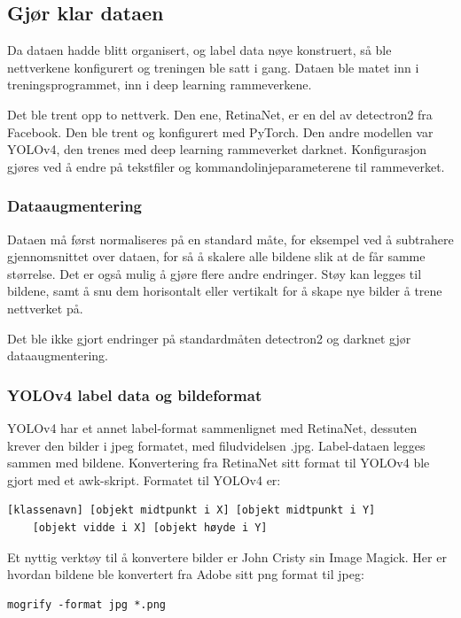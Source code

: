 \subsection{Gjør klar dataen}

Da dataen hadde blitt organisert, og label data nøye konstruert, så ble nettverkene konfigurert og treningen ble satt i gang. Dataen ble matet inn i treningsprogrammet, inn i deep learning rammeverkene.

Det ble trent opp to nettverk. Den ene, RetinaNet, er en del av detectron2 fra Facebook. Den ble trent og konfigurert med PyTorch. Den andre modellen var YOLOv4, den trenes med deep learning rammeverket darknet. Konfigurasjon gjøres ved å endre på tekstfiler og kommandolinjeparameterene til rammeverket.

\subsubsection{Dataaugmentering}

Dataen må først normaliseres på en standard måte, for eksempel ved å subtrahere gjennomsnittet over dataen, for så å skalere alle bildene slik at de får samme størrelse. Det er også mulig å gjøre flere andre endringer. Støy kan legges til bildene, samt å snu dem horisontalt eller vertikalt for å skape nye bilder å trene nettverket på.

Det ble ikke gjort endringer på standardmåten detectron2 og darknet gjør dataaugmentering.

\subsubsection{YOLOv4 label data og bildeformat}

YOLOv4 har et annet label-format sammenlignet med RetinaNet, dessuten krever den bilder i jpeg formatet, med filudvidelsen .jpg. Label-dataen legges sammen med bildene. Konvertering fra RetinaNet sitt format til YOLOv4 ble gjort med et awk-skript. Formatet til YOLOv4 er:

\begin{verbatim}
[klassenavn] [objekt midtpunkt i X] [objekt midtpunkt i Y]
	[objekt vidde i X] [objekt høyde i Y]
\end{verbatim}

Et nyttig verktøy til å konvertere bilder er John Cristy sin Image Magick. Her er hvordan bildene ble konvertert fra Adobe sitt png format til jpeg:

\begin{verbatim}
mogrify -format jpg *.png
\end{verbatim}

